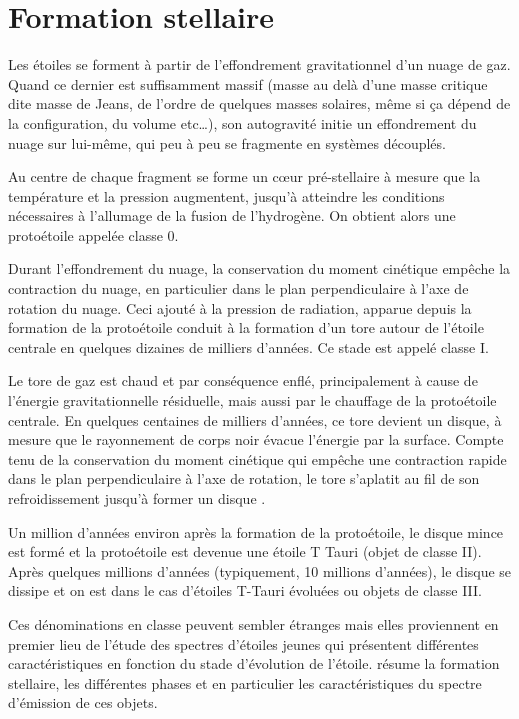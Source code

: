 \section{Formation stellaire}
Les étoiles se forment à partir de l'effondrement gravitationnel d'un nuage de gaz. Quand ce dernier est suffisamment massif
(masse au delà d'une masse critique dite masse de Jeans, de l'ordre de quelques masses solaires, même si ça dépend de la
configuration, du volume etc\dots), son autogravité initie un effondrement du nuage sur lui-même, qui peu à peu se fragmente en
systèmes découplés. 

Au centre de chaque fragment se forme un cœur pré-stellaire à mesure que la température et la pression augmentent, jusqu'à atteindre les conditions nécessaires à l'allumage de la fusion de l'hydrogène. On obtient alors une protoétoile appelée \og classe 0\fg. 

Durant l'effondrement du nuage, la conservation du moment cinétique empêche la contraction du nuage, en particulier dans le plan perpendiculaire à l'axe de rotation du nuage. Ceci ajouté à la pression de radiation, apparue depuis la formation de la protoétoile conduit à la formation d'un tore autour de l'étoile centrale en quelques dizaines de milliers d'années. Ce stade est appelé \og classe I\fg.

Le tore de gaz est chaud et par conséquence enflé, principalement à cause de l'énergie gravitationnelle résiduelle, mais aussi par le chauffage de la protoétoile centrale.
En quelques centaines de milliers d'années, ce tore devient un disque, à mesure que le rayonnement de corps noir évacue
l'énergie par la surface. Compte tenu de la conservation du
moment cinétique qui empêche une contraction rapide dans le plan perpendiculaire à l'axe de rotation, le tore s'aplatit
au fil de son refroidissement jusqu'à former un disque \citep{williams2011protoplanetary}. 

Un million d'années environ après la formation de la protoétoile, le disque mince est formé et la protoétoile est devenue une étoile T Tauri (objet de classe II). Après quelques millions d'années (typiquement, 10 millions d'années), le disque se dissipe et on est dans le cas d'étoiles T-Tauri évoluées ou objets de classe III. 

Ces dénominations en classe peuvent sembler étranges mais elles proviennent en premier lieu de l'étude des spectres d'étoiles jeunes qui présentent différentes caractéristiques en fonction du stade d'évolution de l'étoile.  résume la formation stellaire, les différentes phases et en particulier les caractéristiques du spectre d'émission de ces objets.
 
